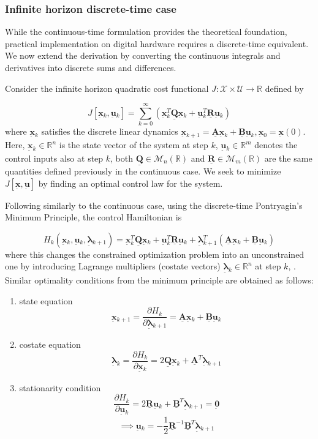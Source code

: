 \documentclass[12pt]{article}
\newcommand{\vb}[1]{{\underset{\tilde{}}{\mathbf{#1}}}}
\newcommand{\mb}[1]{\underline{\mathbf{#1}}}
\begin{document}
\subsubsection{Infinite horizon discrete-time case}
\label{sec:lqr-discrete}

While the continuous-time formulation provides the theoretical foundation, practical implementation on digital hardware requires a discrete-time equivalent. We now extend the derivation by converting the continuous integrals and derivatives into discrete sums and differences. 

Consider the infinite horizon quadratic cost functional \(J: \mathcal{X} \times \mathcal{U} \to \mathbb{R}\) defined by

\[
J [\vb{x}{}_k, \vb{u}{}_k] = \sum_{k=0}^\infty \left( \vb{x}{}_k^T \mb{Q}\vb{x}{}_k + \vb{u}{}_k^T \mb{R} \vb{u}{}_k \right)
\]
where \(\vb{x}{}_k\) satisfies the discrete linear dynamics \(\vb{x}{}_{k+1} = \mb{A}\vb{x}{}_k + \mb{B}\vb{u}{}_k, \vb{x}{}_0 = \vb{x}{}(0)\). Here, \(\vb{x}{}_k \in \mathbb{R}^n\) is the state vector of the system at step \(k\), \(\vb{u}{}_k \in \mathbb{R}^m\) denotes the control inputs also at step $k$, both \(\mb{Q}\in \mathcal{M}_n (\mathbb{R})\) and \(\mb{R} \in \mathcal{M}_m (\mathbb{R})\) are the same quantities defined previously in the continuous case. We seek to minimize \(J[\vb{x}, \vb{u}]\) by finding an optimal control law for the system.

Following similarly to the continuous case, using the discrete-time Pontryagin's Minimum Principle, the control Hamiltonian is

\[
H_k(\vb{x}{}_k, \vb{u}{}_k, \vb{\boldsymbol{\lambda}}{}_{k+1}) = \vb{x}{}_k^T \mb{Q}\vb{x}{}_k + \vb{u}{}_k^T \mb{R} \vb{u}{}_k + \vb{\boldsymbol{\lambda}}{}_{k+1}^T (\mb{A}\vb{x}{}_k + \mb{B}\vb{u}{}_k)
\]
where this changes the constrained optimization problem into an unconstrained one by introducing Lagrange multipliers (costate vectors) \(\vb{\boldsymbol{\lambda}}{}_k \in \mathbb{R}^n\) at step $k$, . Similar optimality conditions from the minimum principle are obtained as follows:
\begin{enumerate}
    \item state equation  \[\vb{x}{}_{k+1} = \frac{\partial H_k}{\partial \vb{\boldsymbol{\lambda}}{}_{k+1}} = \mb{A}\vb{x}{}_k + \mb{B}\vb{u}{}_k\]
    \item costate equation \[ \vb{\boldsymbol{\lambda}}{}_k = \frac{\partial H_k}{\partial \vb{x}{}_k} = 2\mb{Q}\vb{x}{}_k + \mb{A}^T\vb{\boldsymbol{\lambda}}{}_{k+1}\]
    \item stationarity condition \[\frac{\partial H_k}{\partial \vb{u}{}_k} = 2\mb{R}\vb{u}{}_k + \mb{B}^T\vb{\boldsymbol{\lambda}}{}_{k+1} = \vb{0}{}\]
    \[
    \implies \vb{u}{}_k = -\frac{1}{2}\mb{R}^{-1}\mb{B}^T\vb{\boldsymbol{\lambda}}{}_{k+1}
    \]
\end{enumerate}
\end{document}
